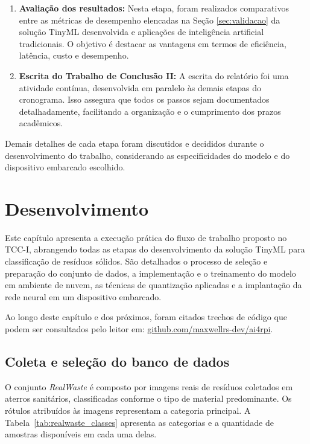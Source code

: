 \documentclass[repeatfields,xlists,xpacks,oneside]{ufrgscca}
\begin{document}
\begin{enumerate}
    \item \textbf{Avaliação dos resultados:}  
    Nesta etapa, foram realizados comparativos entre as métricas de desempenho elencadas na Seção \ref{sec:validacao} da solução TinyML desenvolvida e aplicações de inteligência artificial tradicionais. O objetivo é destacar as vantagens em termos de eficiência, latência, custo e desempenho.
    
    \item \textbf{Escrita do Trabalho de Conclusão II:}  
    A escrita do relatório foi uma atividade contínua, desenvolvida em paralelo às demais etapas do cronograma. Isso assegura que todos os passos sejam documentados detalhadamente, facilitando a organização e o cumprimento dos prazos acadêmicos.
\end{enumerate}

Demais detalhes de cada etapa foram discutidos e decididos durante o desenvolvimento do trabalho, considerando as especificidades do modelo e do dispositivo embarcado escolhido.

\chapter{Desenvolvimento}
\label{cap:desenvolvimento}

Este capítulo apresenta a execução prática do fluxo de trabalho proposto no TCC-I, abrangendo todas as etapas do desenvolvimento da solução TinyML para classificação de resíduos sólidos. São detalhados o processo de seleção e preparação do conjunto de dados, a implementação e o treinamento do modelo em ambiente de nuvem, as técnicas de quantização aplicadas e a implantação da rede neural em um dispositivo embarcado.

Ao longo deste capítulo e dos próximos, foram citados trechos de código que podem ser consultados pelo leitor em: \href{https://github.com/maxwellrs-dev/ai4rpi}{github.com/maxwellrs-dev/ai4rpi}.

\section{Coleta e seleção do banco de dados}
\label{sec:coleta}

O conjunto \textit{RealWaste} é composto por imagens reais de resíduos coletados em aterros sanitários, classificadas conforme o tipo de material predominante. Os rótulos atribuídos às imagens representam a categoria principal. A Tabela~\ref{tab:realwaste_classes} apresenta as categorias e a quantidade de amostras disponíveis em cada uma delas.
\end{document}
